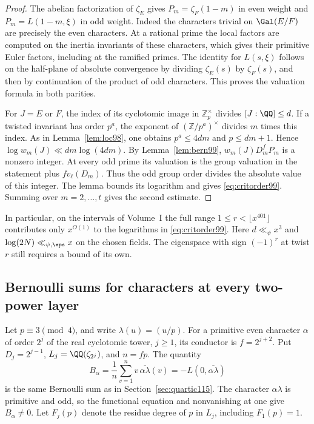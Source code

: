 \documentclass[a4paper,11pt]{article}
\theoremstyle{definition}
\theoremstyle{remark}
\newcommand{\ZZ}{\mathbb Z}\newcommand{\ord}{\operatorname{ord}}
\numberwithin{equation}{section}
\begin{document}
\begin{proof}
The abelian factorization of \(\zeta_E\) gives \(P_m=\zeta_F(1-m)\)
in even weight and \(P_m=L(1-m,\xi)\) in odd weight. Indeed the
characters trivial on \(\Gal(E/F)\) are precisely the even
characters. At a rational prime the local factors are computed on
the inertia invariants of these characters, which gives their
primitive Euler factors, including at the ramified primes.
The identity for \(L(s,\xi)\) follows on the half-plane of absolute
convergence by dividing \(\zeta_E(s)\) by \(\zeta_F(s)\), and then
by continuation of the product of odd characters. This proves the
valuation formula in both parities.

For \(J=E\) or \(F\), the index of its cyclotomic image in
\(\ZZ_p^\times\) divides \([J:\QQ]\le d\). If a twisted invariant
has order \(p^a\), the exponent of \((\ZZ/p^a)^\times\) divides
\(m\) times this index. As in Lemma~\ref{lem:loc98}, one obtains
\(p^a\le 4dm\) and \(p\le dm+1\). Hence
\(\log w_m(J)\ll dm\log(4dm)\).
By Lemma~\ref{lem:bern99}, \(w_m(J)D_m^fP_m\) is a nonzero
integer. At every odd prime its valuation is the group valuation
in the statement plus \(f v_\ell(D_m)\). Thus the odd group order
divides the absolute value of this integer. The lemma bounds its
logarithm and gives \eqref{eq:critorder99}. Summing over
\(m=2,\ldots,t\) gives the second estimate.
\end{proof}

In particular, on the intervals of Volume~I the full range
\(1\le r<\lfloor x^{401}\rfloor\) contributes only \(x^{O(1)}\)
to the logarithms in \eqref{eq:critorder99}. Here \(d\ll_\psi x^3\)
and \(\log(2N)\ll_{\psi,\eps}x\) on the chosen fields. The
eigenspace with sign \((-1)^r\) at twist \(r\) still requires a
bound of its own.

\subsection{Bernoulli sums for characters at every two-power layer}\label{nav:III-19}
\label{sec:bern139}

Let \(p\equiv3\pmod4\), and write \(\lambda(u)=(u/p)\).
For a primitive even character \(\alpha\) of order \(2^j\)
of the real cyclotomic tower, \(j\ge1\), its conductor is
\(f=2^{j+2}\). Put \(D_j=2^{j-1}\),
\(L_j=\QQ(\zeta_{2^j})\), and \(n=fp\). The quantity
\[
    B_\alpha=\frac1n\sum_{v=1}^n v\,\overline{\alpha\lambda}(v)
                 =-L(0,\overline{\alpha\lambda})
\]
is the same Bernoulli sum as in Section~\ref{sec:quartic115}.
The character \(\alpha\lambda\) is primitive and odd, so the
functional equation and nonvanishing at one give \(B_\alpha\ne0\).
Let \(F_j(p)\) denote the residue degree of \(p\) in \(L_j\),
including \(F_1(p)=1\).
\end{document}
